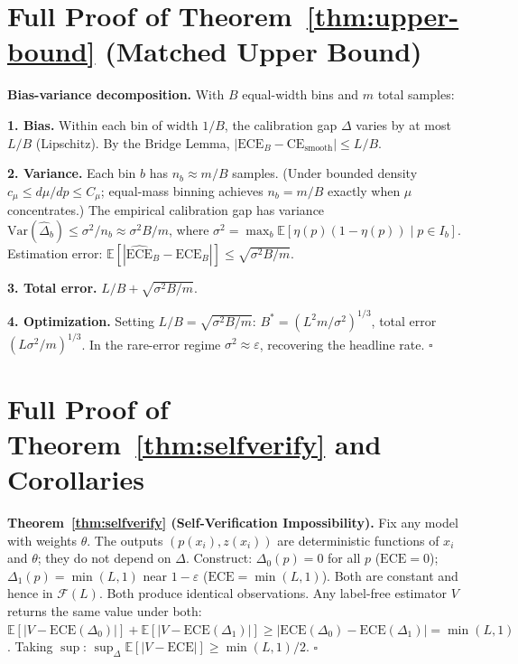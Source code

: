 \documentclass{article}
\newcommand{\ECE}{\mathrm{ECE}}
\newcommand{\CE}{\mathrm{CE}}
\newcommand{\cF}{\mathcal{F}}
\newcommand{\Lip}{L}
\newcommand{\errrate}{\varepsilon}
\newcommand{\nsamples}{m}
\newcommand{\calmapraw}{\eta}
\newcommand{\calmap}{\Delta}
\newcommand{\scoredist}{\mu}
\providecommand{\E}{}
\renewcommand{\E}{\mathbb{E}}
\providecommand{\Var}{}
\renewcommand{\Var}{\mathrm{Var}}
\newcommand{\effnoise}{\sigma^2}
\theoremstyle{definition}
\begin{document}
\section{Full Proof of Theorem~\ref{thm:upper-bound} (Matched Upper Bound)}
\label{app:upper-proof}

\textbf{Bias-variance decomposition.} With $B$ equal-width bins and $\nsamples$ total samples:

\textbf{1. Bias.} Within each bin of width $1/B$, the calibration gap $\calmap$ varies by at most $\Lip/B$ (Lipschitz). By the Bridge Lemma, $|\ECE_B - \CE_{\mathrm{smooth}}| \leq \Lip/B$.

\textbf{2. Variance.} Each bin $b$ has $n_b \approx \nsamples/B$ samples. (Under bounded density $c_\scoredist \leq d\scoredist/dp \leq C_\scoredist$; equal-mass binning achieves $n_b = \nsamples/B$ exactly when $\scoredist$ concentrates.) The empirical calibration gap has variance $\Var(\hat{\calmap}_b) \leq \effnoise / n_b \approx \effnoise B/\nsamples$, where $\effnoise = \max_b \E[\calmapraw(p)(1-\calmapraw(p)) \mid p \in I_b]$. Estimation error: $\E[|\widehat{\ECE}_B - \ECE_B|] \leq \sqrt{\effnoise B/\nsamples}$.

\textbf{3. Total error.} $\Lip/B + \sqrt{\effnoise B/\nsamples}$.

\textbf{4. Optimization.} Setting $\Lip/B = \sqrt{\effnoise B/\nsamples}$: $B^* = (\Lip^2\nsamples/\effnoise)^{1/3}$, total error $(\Lip\effnoise/\nsamples)^{1/3}$. In the rare-error regime $\effnoise \approx \errrate$, recovering the headline rate. $\square$

\section{Full Proof of Theorem~\ref{thm:selfverify} and Corollaries}
\label{app:selfverify-proof}

\textbf{Theorem~\ref{thm:selfverify} (Self-Verification Impossibility).}
Fix any model with weights $\theta$. The outputs $(p(x_i), z(x_i))$ are deterministic functions of $x_i$ and $\theta$; they do not depend on $\calmap$. Construct:
$\calmap_0(p) = 0$ for all $p$ ($\ECE = 0$); $\calmap_1(p) = \min(\Lip, 1)$ near $1-\errrate$ ($\ECE = \min(\Lip,1)$). Both are constant and hence in $\cF(\Lip)$. Both produce identical observations. Any label-free estimator $V$ returns the same value under both:
$\E[|V - \ECE(\calmap_0)|] + \E[|V - \ECE(\calmap_1)|] \geq |\ECE(\calmap_0) - \ECE(\calmap_1)| = \min(\Lip,1)$.
Taking $\sup$: $\sup_\calmap \E[|V - \ECE|] \geq \min(\Lip,1)/2$. $\square$
\end{document}
